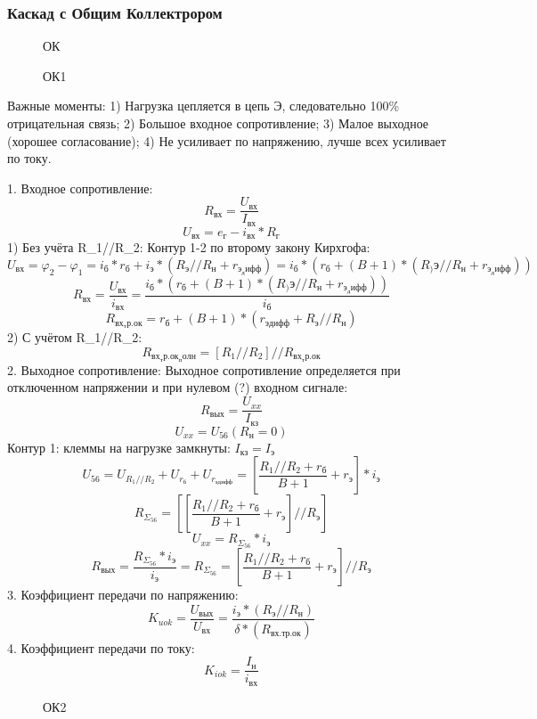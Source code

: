 \subsubsection{Каскад с Общим Коллектрором}

\begin{center}
\begin{figure}[h!]
\caption{ОК}
\end{figure}
\end{center}

\begin{center}
\begin{figure}[h!]
\caption{ОК1}
\end{figure}
\end{center}
Важные моменты:
1) Нагрузка цепляется в цепь Э, следовательно 100\% отрицательная связь;
2) Большое входное сопротивление;
3) Малое выходное (хорошее согласование);
4) Не усиливает по напряжению, лучше всех усиливает по току.

1. Входное сопротивление:
$$
R_{вх} = \frac{U_{вх}}{I_{вх}}
$$
$$
U_{вх} = e_{г}-i_{вх}*R_г
$$
1) Без учёта R_{1}//R_{2}:
Контур 1-2 по второму закону Кирхгофа:
$$
U_{вх}=\varphi_{2}-\varphi_{1}=i_{б}*r_{б}+i_{э}*(R_{э}//R_{н}+r_{э_дифф})=i_{б}*(r_{б}+(B+1)*(R_){э}//R_{н}+r_{э_дифф}))
$$
$$
R_{вх}=\frac{U_{вх}}{i_{вх}}=\frac{i_{б}*(r_{б}+(B+1)*(R_){э}//R_{н}+r_{э_дифф}))}{i_{б}}
$$
$$
R_{вх_тр.ок}=r_{б}+(B+1)*(r_{эдифф}+R_{э}//R_{н})
$$
2) С учётом R_{1}//R_{2}:
$$
R_{вх_тр.ок_полн}=[R_{1}//R_{2}]//R_{вх_тр.ок}
$$
2. Выходное сопротивление:
Выходное сопротивление определяется при отключенном напряжении и при нулевом (?) входном сигнале:
$$
R_{вых}=\frac{U_{xx}}{I_{кз}}
$$
$$
U_{xx}=U_{56}(R_{н}=0)
$$
Контур 1: клеммы на нагрузке замкнуты: $ I_{кз}=I_{э} $
$$
U_{56}=U_{R_{1}//R_{2}}+U_{r_{б}}+U_{r_{эдифф}}=[\frac{R_{1}//R_{2}+r_{б}}{B+1}+r_{э}]*i_{э}
$$
$$
R_{\Sigma_56}=[[\frac{R_{1}//R_{2}+r_{б}}{B+1}+r_{э}]//R_{э}]
$$
$$
U_{xx}=R_{\Sigma_56}*i_{э}
$$
$$
R_{вых}=\frac{R_{\Sigma_56}*i_{э}}{i_{э}}=R_{\Sigma_56}=[\frac{R_{1}//R_{2}+r_{б}}{B+1}+r_{э}]//R_{э}
$$
3. Коэффициент передачи по напряжению:
$$
K_{uok}=\frac{U_{вых}}{U_{вх}}=\frac{i_{э}*(R_{э}//R_{н})}{\delta*(R_{вх.тр.ок})}
$$
4. Коэффициент передачи по току:
$$
K_{iok}=\frac{I_{н}}{i_{вх}}
$$
\begin{center}
\begin{figure}[h!]
\caption{ОК2}
\end{figure}
\end{center}


